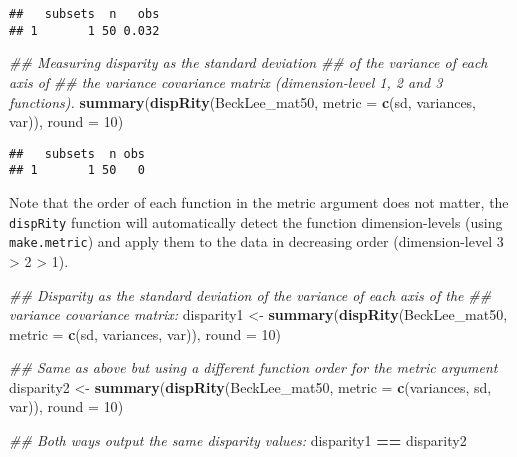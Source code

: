 \documentclass[
]{book}
\newenvironment{Shaded}{\begin{snugshade}}{\end{snugshade}}
\newcommand{\CommentTok}[1]{\textcolor[rgb]{0.56,0.35,0.01}{\textit{#1}}}
\newcommand{\DataTypeTok}[1]{\textcolor[rgb]{0.13,0.29,0.53}{#1}}
\newcommand{\DecValTok}[1]{\textcolor[rgb]{0.00,0.00,0.81}{#1}}
\newcommand{\KeywordTok}[1]{\textcolor[rgb]{0.13,0.29,0.53}{\textbf{#1}}}
\newcommand{\NormalTok}[1]{#1}
\newcommand{\OperatorTok}[1]{\textcolor[rgb]{0.81,0.36,0.00}{\textbf{#1}}}
\newcommand{\StringTok}[1]{\textcolor[rgb]{0.31,0.60,0.02}{#1}}
\begin{document}
\begin{verbatim}
##   subsets  n   obs
## 1       1 50 0.032
\end{verbatim}

\begin{Shaded}
\begin{Highlighting}[]
\CommentTok{\#\# Measuring disparity as the standard deviation}
\CommentTok{\#\# of the variance of each axis of}
\CommentTok{\#\# the variance covariance matrix (dimension{-}level 1, 2 and 3 functions).}
\KeywordTok{summary}\NormalTok{(}\KeywordTok{dispRity}\NormalTok{(BeckLee\_mat50, }\DataTypeTok{metric =} \KeywordTok{c}\NormalTok{(sd, variances, var)), }\DataTypeTok{round =} \DecValTok{10}\NormalTok{)}
\end{Highlighting}
\end{Shaded}

\begin{verbatim}
##   subsets  n obs
## 1       1 50   0
\end{verbatim}

Note that the order of each function in the metric argument does not matter, the \texttt{dispRity} function will automatically detect the function dimension-levels (using \texttt{make.metric}) and apply them to the data in decreasing order (dimension-level 3 \textgreater{} 2 \textgreater{} 1).

\begin{Shaded}
\begin{Highlighting}[]
\CommentTok{\#\# Disparity as the standard deviation of the variance of each axis of the}
\CommentTok{\#\# variance covariance matrix:}
\NormalTok{disparity1 \textless{}{-}}\StringTok{ }\KeywordTok{summary}\NormalTok{(}\KeywordTok{dispRity}\NormalTok{(BeckLee\_mat50,}
                               \DataTypeTok{metric =} \KeywordTok{c}\NormalTok{(sd, variances, var)),}
                      \DataTypeTok{round =} \DecValTok{10}\NormalTok{)}

\CommentTok{\#\# Same as above but using a different function order for the metric argument}
\NormalTok{disparity2 \textless{}{-}}\StringTok{ }\KeywordTok{summary}\NormalTok{(}\KeywordTok{dispRity}\NormalTok{(BeckLee\_mat50,}
                               \DataTypeTok{metric =} \KeywordTok{c}\NormalTok{(variances, sd, var)),}
                      \DataTypeTok{round =} \DecValTok{10}\NormalTok{)}

\CommentTok{\#\# Both ways output the same disparity values:}
\NormalTok{disparity1 }\OperatorTok{==}\StringTok{ }\NormalTok{disparity2}
\end{Highlighting}
\end{Shaded}
\end{document}
